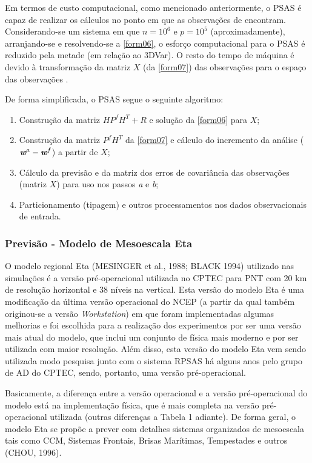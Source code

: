 Em termos de custo computacional, como mencionado anteriormente, o PSAS é capaz de realizar os cálculos no ponto em que as observações de encontram. Considerando-se um sistema em que $n=10^{6}$ e $p=10^{5}$ (aproximadamente), arranjando-se e resolvendo-se a \autoref{form06}, o esforço computacional para o PSAS é reduzido pela metade (em relação ao 3DVar). O resto do tempo de máquina é devido à transformação da matriz $X$ (da \autoref{form07}) das observações para o espaço das observações \cite{cohnetal98}.

De forma simplificada, o PSAS segue o seguinte algoritmo:

\begin{enumerate}
\item Construção da matriz $HP^{f}H^{T}+R$ e solução da \autoref{form06} para $X$;
\item Construção da matriz $P^{f}H^{T}$ da \autoref{form07} e cálculo do incremento da análise ($\textit{\textbf{w}}^a-\textit{\textbf{w}}^f$) a partir de $X$;
\item Cálculo da previsão e da matriz dos erros de covariância das observações (matriz $X$) para uso nos passos \textit{a} e \textit{b};
\item Particionamento (tipagem) e outros processamentos nos dados observacionais de entrada.
\end{enumerate}

\subsubsection{Previsão - Modelo de Mesoescala Eta}

O modelo regional Eta (MESINGER et al., 1988; BLACK 1994) utilizado nas simulações é a versão pré-operacional utilizada no CPTEC para PNT com 20 km de resolução horizontal e 38 níveis na vertical. Esta versão do modelo Eta é uma modificação da última versão operacional do NCEP (a partir da qual também originou-se a versão \textit{Workstation}) em que foram implementadas algumas melhorias  e foi escolhida para a realização dos experimentos por ser uma versão mais atual do modelo, que inclui um conjunto de física mais moderno e por ser utilizada com maior resolução. Além disso, esta versão do modelo Eta vem sendo utilizada modo pesquisa junto com o sistema RPSAS há alguns anos pelo grupo de AD do CPTEC, sendo, portanto, uma versão pré-operacional. 

Basicamente, a diferença entre a versão operacional e a versão pré-operacional do modelo está na implementação física, que é mais completa na versão pré-operacional utilizada (outras diferenças a Tabela 1 adiante). De forma geral, o modelo Eta se propõe a prever com detalhes sistemas organizados de mesoescala tais como CCM, Sistemas Frontais, Brisas Marítimas, Tempestades e outros (CHOU, 1996).

